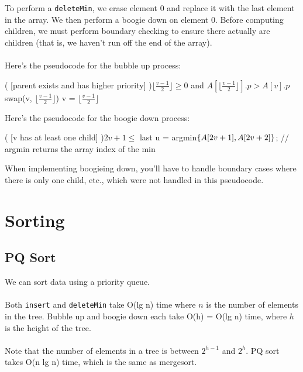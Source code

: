 \documentclass[]{article}
\theoremstyle{definition}
\DeclarePairedDelimiter{\set}{\lbrace}{\rbrace}
\begin{document}
\begin{enumerate}
						\\ \\
						To perform a \verb+deleteMin+, we erase element 0 and replace it with the last element in the array. We then perform a boogie down on element 0. Before computing children, we must perform boundary checking to ensure there actually are children (that is, we haven't run off the end of the array).
						\\ \\
						Here's the pseudocode for the bubble up process: \\
						\begin{algorithm}[H]
							\While( [parent exists and has higher priority] ){$\lfloor \frac{v - 1}{2} \rfloor \ge 0$ and $A[\lfloor \frac{v - 1}{2} \rfloor].p > A[v].p$}{ 
								swap(v, $\lfloor \frac{v - 1}{2} \rfloor$)\;
								v = $\lfloor \frac{v - 1}{2} \rfloor$\;
							}
						\end{algorithm}

						Here's the pseudocode for the boogie down process: \\
						\begin{algorithm}[H]
							\While( [v has at least one child] ){$2v + 1 \le$ last}{
								u = argmin$\set{A[2v + 1], A[2v + 2]}$; // argmin returns the array index of the min \\
							}
						\end{algorithm}
						
						When implementing boogieing down, you'll have to handle boundary cases where there is only one child, etc., which were not handled in this pseudocode.
				\end{enumerate}
	\section{Sorting}
		\subsection{PQ Sort}
			We can sort data using a priority queue. \\ \\
			Both \verb+insert+ and \verb+deleteMin+ take O(lg n) time where $n$ is the number of elements in the tree. Bubble up and boogie down each take O(h) = O(lg n) time, where $h$ is the height of the tree.
			\\ \\
			Note that the number of elements in a tree is between $2^{h - 1}$ and $2^h$. PQ sort takes O(n lg n) time, which is the same as mergesort.
		
\end{document}
